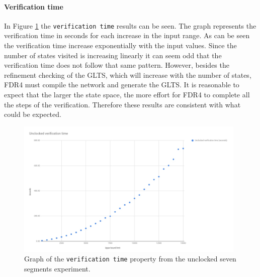 \paragraph{Verification time}
In Figure \ref{fig:unclocked_verification} the \texttt{verification time} results can be seen. The graph represents the verification time in seconds for each increase in the input range. As can be seen the verification time increase exponentially with the input values. Since the number of states visited is increasing linearly it can seem odd that the verification time does not follow that same pattern. However, besides the refinement checking of the GLTS, which will increase with the number of states, FDR4 must compile the network and generate the GLTS. It is reasonable to expect that the larger the state space, the more effort for FDR4 to complete all the steps of the verification. Therefore these results are consistent with what could be expected.
\begin{figure}
    \includegraphics[width=0.98\textwidth]{./figures/temporary_graphs/unclocked_verification_time.jpg}
\caption{Graph of the \texttt{verification time} property from the unclocked seven segments experiment.}
\label{fig:unclocked_verification}
\end{figure}
